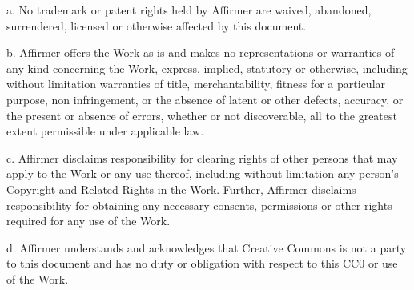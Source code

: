 \begin{DoxyEnumerate}
a. No trademark or patent rights held by Affirmer are waived, abandoned, surrendered, licensed or otherwise affected by this document.

b. Affirmer offers the Work as-\/is and makes no representations or warranties of any kind concerning the Work, express, implied, statutory or otherwise, including without limitation warranties of title, merchantability, fitness for a particular purpose, non infringement, or the absence of latent or other defects, accuracy, or the present or absence of errors, whether or not discoverable, all to the greatest extent permissible under applicable law.

c. Affirmer disclaims responsibility for clearing rights of other persons that may apply to the Work or any use thereof, including without limitation any person's Copyright and Related Rights in the Work. Further, Affirmer disclaims responsibility for obtaining any necessary consents, permissions or other rights required for any use of the Work.

d. Affirmer understands and acknowledges that Creative Commons is not a party to this document and has no duty or obligation with respect to this C\+C0 or use of the Work. 
\end{DoxyEnumerate}